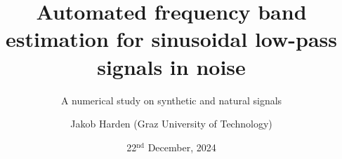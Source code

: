 \documentclass[11pt,aspectratio=169]{beamer}
\def\PresTitle{Automated frequency band estimation for sinusoidal low-pass signals in noise}
\def\PresSubTitle{A numerical study on synthetic and natural signals}
\def\PresDate{22${}^{\text{nd}}$ December, 2024}
\def\PresAuthorFirstname{Jakob}
\def\PresAuthorLastname{Harden}
\def\PresAuthor{\PresAuthorFirstname{} \PresAuthorLastname{}}
\def\PresAuthorAffiliation{Graz University of Technology}
\begin{document}
	\author{\PresAuthor{} (\PresAuthorAffiliation{})}
	\title{\PresTitle{}}
	\subtitle{\PresSubTitle{}}
	\date{\PresDate{}}
	\begin{frame}[plain]
		\maketitle
	\end{frame}
\end{document}
